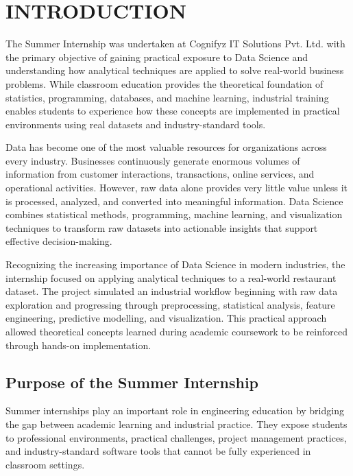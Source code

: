 \documentclass[12pt,a4paper]{report}
\begin{document}

\chapter{INTRODUCTION}

The Summer Internship was undertaken at Cognifyz IT Solutions Pvt. Ltd. with the primary objective of gaining practical exposure to Data Science and understanding how analytical techniques are applied to solve real-world business problems. While classroom education provides the theoretical foundation of statistics, programming, databases, and machine learning, industrial training enables students to experience how these concepts are implemented in practical environments using real datasets and industry-standard tools.

Data has become one of the most valuable resources for organizations across every industry. Businesses continuously generate enormous volumes of information from customer interactions, transactions, online services, and operational activities. However, raw data alone provides very little value unless it is processed, analyzed, and converted into meaningful information. Data Science combines statistical methods, programming, machine learning, and visualization techniques to transform raw datasets into actionable insights that support effective decision-making.

Recognizing the increasing importance of Data Science in modern industries, the internship focused on applying analytical techniques to a real-world restaurant dataset. The project simulated an industrial workflow beginning with raw data exploration and progressing through preprocessing, statistical analysis, feature engineering, predictive modelling, and visualization. This practical approach allowed theoretical concepts learned during academic coursework to be reinforced through hands-on implementation.


\section{Purpose of the Summer Internship}

Summer internships play an important role in engineering education by bridging the gap between academic learning and industrial practice. They expose students to professional environments, practical challenges, project management practices, and industry-standard software tools that cannot be fully experienced in classroom settings.
\end{document}

